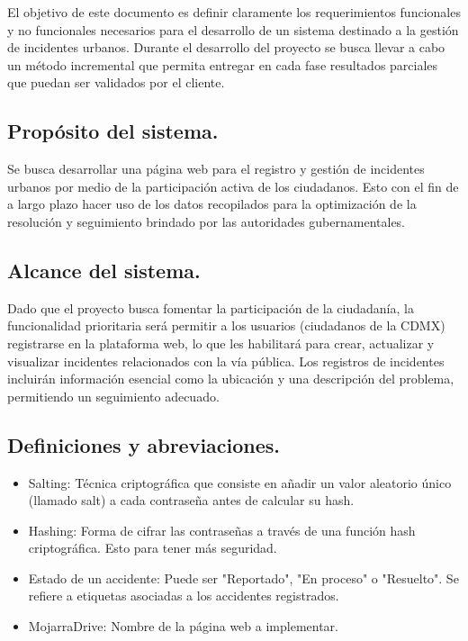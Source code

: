 El objetivo de este documento es definir claramente los requerimientos funcionales y no funcionales necesarios para el desarrollo de un sistema destinado a la gestión de incidentes urbanos. Durante el desarrollo del proyecto se busca llevar a cabo un método incremental que permita entregar en cada fase resultados parciales que puedan ser validados por el cliente.

\subsection{Propósito del sistema.}

Se busca desarrollar una página web para el registro y gestión de incidentes urbanos por medio de la participación activa de los ciudadanos. Esto con el fin de a largo plazo hacer uso de los datos recopilados para la optimización de la resolución y seguimiento brindado por las autoridades gubernamentales.

\subsection{Alcance del sistema.}

Dado que el proyecto busca fomentar la participación de la ciudadanía, la funcionalidad prioritaria será permitir a los usuarios (ciudadanos de la CDMX) registrarse en la plataforma web, lo que les habilitará para crear, actualizar y visualizar incidentes relacionados con la vía pública. Los registros de incidentes incluirán información esencial como la ubicación y una descripción del problema, permitiendo un seguimiento adecuado.

\subsection{Definiciones y abreviaciones.}
\begin{itemize}
    \item Salting: Técnica criptográfica que consiste en añadir un valor aleatorio único (llamado salt) a cada contraseña antes de calcular su hash. 
    \item Hashing: Forma de cifrar las contraseñas a través de una función hash criptográfica. Esto para tener más seguridad.
    \item Estado de un accidente: Puede ser "Reportado", "En proceso" o "Resuelto". Se refiere a etiquetas asociadas a los accidentes registrados.
    \item MojarraDrive: Nombre de la página web a implementar.
\end{itemize}

